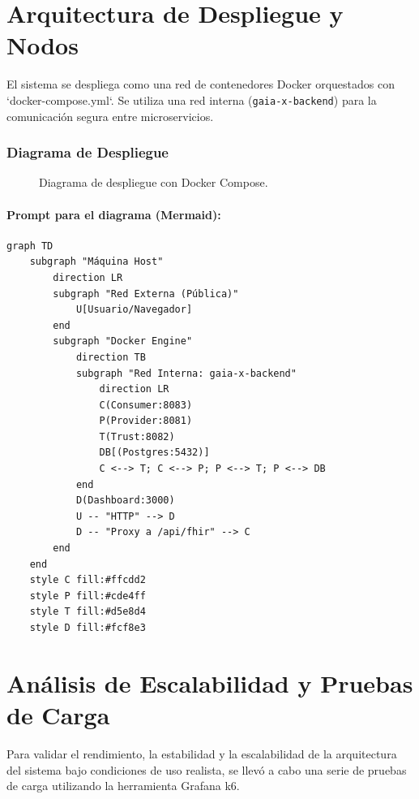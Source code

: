 \section{Arquitectura de Despliegue y Nodos}

El sistema se despliega como una red de contenedores Docker orquestados con `docker-compose.yml`. Se utiliza una red interna (\texttt{gaia-x-backend}) para la comunicación segura entre microservicios.

\subsubsection*{Diagrama de Despliegue}
\begin{figure}[H]
    \centering
    \caption{Diagrama de despliegue con Docker Compose.}
    \label{fig:deployment_diagram}
\end{figure}

\paragraph{Prompt para el diagrama (Mermaid):}
\begin{verbatim}
graph TD
    subgraph "Máquina Host"
        direction LR
        subgraph "Red Externa (Pública)"
            U[Usuario/Navegador]
        end
        subgraph "Docker Engine"
            direction TB
            subgraph "Red Interna: gaia-x-backend"
                direction LR
                C(Consumer:8083)
                P(Provider:8081)
                T(Trust:8082)
                DB[(Postgres:5432)]
                C <--> T; C <--> P; P <--> T; P <--> DB
            end
            D(Dashboard:3000)
            U -- "HTTP" --> D
            D -- "Proxy a /api/fhir" --> C
        end
    end
    style C fill:#ffcdd2
    style P fill:#cde4ff
    style T fill:#d5e8d4
    style D fill:#fcf8e3
\end{verbatim}

\section{Análisis de Escalabilidad y Pruebas de Carga}
\label{sec:pruebas_carga}

Para validar el rendimiento, la estabilidad y la escalabilidad de la arquitectura del sistema bajo condiciones de uso realista, se llevó a cabo una serie de pruebas de carga utilizando la herramienta Grafana k6.

